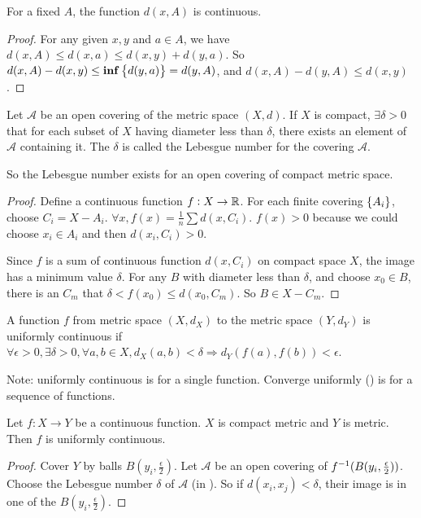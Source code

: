 \begin{theorem}
    For a fixed $A$, the function $d(x,A)$ is continuous.
\end{theorem}
\begin{proof}
    For any given $x,y$ and $a \in A$, we have $d(x,A) \leq d(x,a) \leq d(x,y) + d(y,a)$. So $d(x,A) - d(x,y) \leq \mathbf{inf} \set{d(y,a)} = d(y,A)$, and $d(x,A) - d(y,A) \leq d(x,y)$.
\end{proof}


\begin{theorem}\label{lebesgue_number}
    Let $\mathcal{A}$ be an open covering of the metric space $(X, d)$. If $X$ is compact, $\exists \delta > 0$ that for each subset of $X$ having diameter less than $\delta$, there exists an element of $\mathcal{A}$ containing it. The $\delta$ is called the Lebesgue number for the covering $\mathcal{A}$.
    
    So the Lebesgue number exists for an open covering of compact metric space.
\end{theorem}
\begin{proof}
    Define a continuous function $f : X \rightarrow \mathbb{R}$. For each finite covering $\set{A_i}$, choose $C_i = X - A_i$. $\displaystyle \forall x, f(x) = \frac{1}{n} \sum d(x,C_i)$. $f(x) > 0$ because we could choose $x_i \in A_i$ and then $d(x_i, C_i) > 0$.
    
     Since $f$ is a sum of continuous function $d(x,C_i)$ on compact space $X$, the image has a minimum value $\delta$. For any $B$ with diameter less than $\delta$, and choose $x_0 \in B$, there is an $C_m$ that $\delta < f(x_0) \leq d(x_0, C_m)$. So $B \in X - C_m$.
\end{proof}

\begin{definition}
    A function $f$ from metric space $(X, d_X)$ to the metric space $(Y, d_Y)$ is uniformly continuous if $\forall \epsilon > 0, \exists \delta > 0, \forall a,b \in X, d_X (a,b) < \delta \Rightarrow d_Y \left(f(a), f(b)\right) < \epsilon$.
    
    Note: uniformly continuous is for a single function. Converge uniformly () is for a sequence of functions.
\end{definition}

\begin{theorem}
    Let $f: X \rightarrow Y$ be a continuous function. $X$ is compact metric and $Y$ is metric. Then $f$ is uniformly continuous.    
\end{theorem}
\begin{proof}
    Cover $Y$ by balls $B(y_i, \frac{\epsilon}{2})$. Let $\mathcal{A}$ be an open covering of ${f}^{-1}(B(y_i, \frac{\epsilon}{2}))$. Choose the Lebesgue number $\delta$ of $\mathcal{A}$ (in ). So if $d(x_i, x_j) < \delta$, their image is in one of the $B(y_i, \frac{\epsilon}{2})$.
\end{proof}




